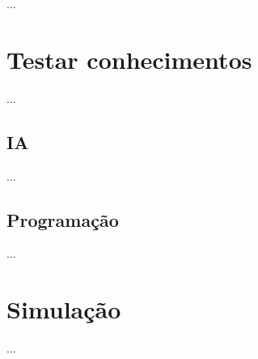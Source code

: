 ...

\section{Testar conhecimentos}

...

\subsection{IA}

...

\subsection{Programação}

...

\section{Simulação}

...